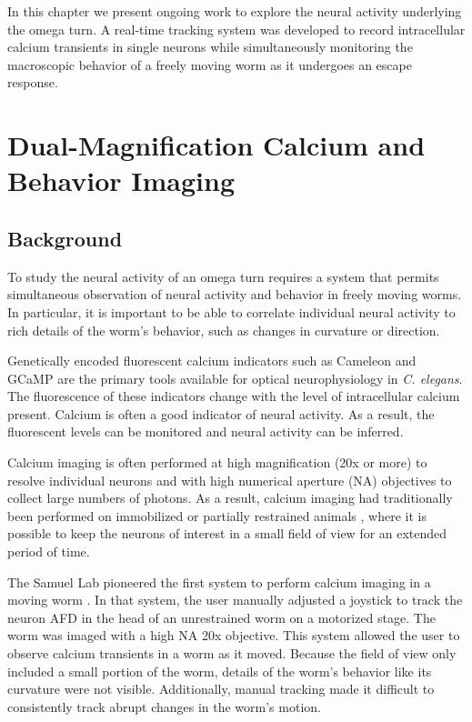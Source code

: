 In this chapter we present ongoing work to explore the neural activity underlying the omega turn. A real-time tracking system was developed to record intracellular calcium transients in single neurons while simultaneously monitoring the macroscopic behavior of a freely moving worm as it undergoes an escape response.



 
\section{Dual-Magnification Calcium and Behavior Imaging}
\subsection{Background}
To study the neural activity of an omega turn requires a system that permits simultaneous observation of neural activity and behavior in freely moving worms.  In particular, it is important to be able to correlate individual neural activity to rich details of the worm's behavior, such as changes in curvature or direction.


Genetically encoded fluorescent calcium indicators such as Cameleon \citep{miyawaki_fluorescent_1997} and GCaMP \citep{tian_imaging_2009} are the primary tools available for optical neurophysiology in \textit{C. elegans}.  The fluorescence of these indicators change with the level of intracellular calcium present. Calcium is often a good indicator of neural activity. As a result, the fluorescent levels can be monitored and neural activity can be inferred.

Calcium imaging is often performed at high magnification (20x or more)  to resolve individual neurons and with high numerical aperture (NA) objectives to collect large numbers of photons. As a result, calcium imaging had traditionally been  performed on immobilized  \citep{clark_afd_2006} or partially restrained animals  \citep{faumont_awake_2006}, where it is possible to keep the neurons of interest in a small field of view for an extended period of time. 

The Samuel Lab pioneered the first system to perform calcium imaging in a moving worm \citep{clark_temporal_2007}. In that system, the user manually adjusted a joystick to track the neuron AFD in the head of an unrestrained worm on a motorized stage. The worm was imaged with a high NA 20x objective. This system allowed the user to observe calcium transients in a worm as it moved. Because the field of view only included a small portion of the worm,  details of the worm's behavior like its curvature were not visible.  Additionally, manual tracking made it difficult to consistently track abrupt changes in the worm's  motion.

